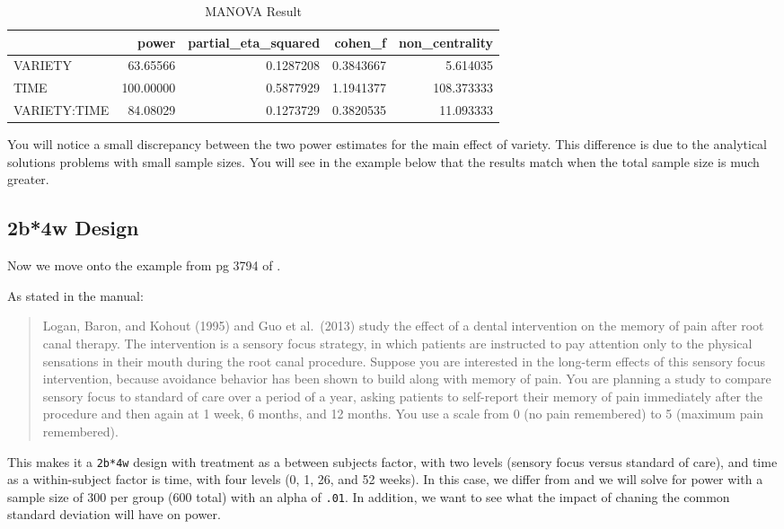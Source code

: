 \documentclass[
]{book}
\begin{document}
\begin{table}[!h]

\caption{\label{tab:unnamed-chunk-164}MANOVA Result}
\centering
\begin{tabular}[t]{l|r|r|r|r}
\hline
  & power & partial\_eta\_squared & cohen\_f & non\_centrality\\
\hline
VARIETY & 63.65566 & 0.1287208 & 0.3843667 & 5.614035\\
\hline
TIME & 100.00000 & 0.5877929 & 1.1941377 & 108.373333\\
\hline
VARIETY:TIME & 84.08029 & 0.1273729 & 0.3820535 & 11.093333\\
\hline
\end{tabular}
\end{table}

You will notice a small discrepancy between the two power estimates for the main effect of variety. This difference is due to the analytical solutions problems with small sample sizes. You will see in the example below that the results match when the total sample size is much greater.

\hypertarget{b4w-design}{%
\subsection{2b*4w Design}\label{b4w-design}}

Now we move onto the example from pg 3794 of \citet{SASglmpower}.

As stated in the manual:

\begin{quote}
Logan, Baron, and Kohout (1995) and Guo et al.~(2013) study the effect of a dental intervention on the
memory of pain after root canal therapy. The intervention is a sensory focus strategy, in which patients are
instructed to pay attention only to the physical sensations in their mouth during the root canal procedure.
Suppose you are interested in the long-term effects of this sensory focus intervention, because avoidance
behavior has been shown to build along with memory of pain. You are planning a study to compare
sensory focus to standard of care over a period of a year, asking patients to self-report their memory of pain
immediately after the procedure and then again at 1 week, 6 months, and 12 months. You use a scale from 0
(no pain remembered) to 5 (maximum pain remembered).
\end{quote}

This makes it a \texttt{2b*4w} design with treatment as a between subjects factor, with two levels (sensory focus versus standard of care), and time as a within-subject factor is time, with four levels (0, 1, 26, and 52 weeks). In this case, we differ from \citet{SASglmpower} and we will solve for power with a sample size of 300 per group (600 total) with an alpha of \texttt{.01}. In addition, we want to see what the impact of chaning the common standard deviation will have on power.
\end{document}
